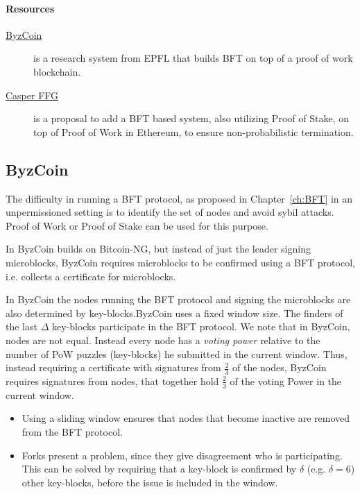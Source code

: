 \paragraph{Resources}
\begin{description}
	\item[ \href{https://www.usenix.org/conference/usenixsecurity16/technical-sessions/presentation/kogias}{ByzCoin}] is a research system from EPFL that builds BFT on top of a proof of work blockchain.
	\item[\href{https://arxiv.org/pdf/1710.09437.pdf}{Casper FFG}] is a proposal to add a BFT based system, also utilizing Proof of Stake, on top of Proof of Work in Ethereum, to ensure non-probabilistic termination. 
\end{description}

\subsection{ByzCoin}

\noindent
The difficulty in running a BFT protocol, as proposed in Chapter~\ref{ch:BFT} in an unpermissioned setting is to identify the set of nodes and avoid sybil attacks. Proof of Work or Proof of Stake can be used for this purpose.

In ByzCoin builds on Bitcoin-NG, but instead of just the leader signing microblocks, ByzCoin requires microblocks to be confirmed using a BFT protocol, i.e. collects a certificate for microblocks.

In ByzCoin the nodes running the BFT protocol and signing the microblocks are also determined by key-blocks.ByzCoin uses a fixed window size. The finders of the last $\Delta$ key-blocks participate in the BFT protocol.
We note that in ByzCoin, nodes are not equal. Instead every node has a \emph{voting power} relative to the number of PoW puzzles (key-blocks) he submitted in the current window. Thus, instead requiring a certificate with signatures from $\frac{2}{3}$ of the nodes, ByzCoin requires signatures from nodes, that together hold $\frac{2}{3}$ of the voting Power in the current window.

\begin{note}
	\begin{itemize}
		\item Using a sliding window ensures that nodes that become inactive are removed from the BFT protocol.
		\item Forks present a problem, since they give disagreement who is participating. This can be solved by requiring that a key-block is confirmed by $\delta$ (e.g. $\delta=6$) other key-blocks, before the issue is included in the window.
	\end{itemize}
\end{note}

